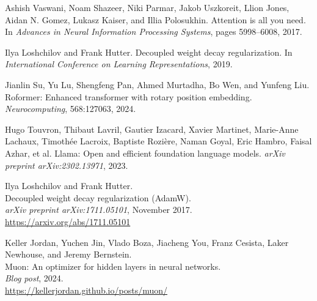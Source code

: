 \documentclass[11pt,a4paper]{article}
\begin{document}
\begin{thebibliography}{9}

Ashish Vaswani, Noam Shazeer, Niki Parmar, Jakob Uszkoreit, Llion Jones, Aidan N. Gomez, Lukasz Kaiser, and Illia Polosukhin.
\newblock Attention is all you need.
\newblock In \emph{Advances in Neural Information Processing Systems}, pages 5998--6008, 2017.

Ilya Loshchilov and Frank Hutter.
\newblock Decoupled weight decay regularization.
\newblock In \emph{International Conference on Learning Representations}, 2019.

Jianlin Su, Yu Lu, Shengfeng Pan, Ahmed Murtadha, Bo Wen, and Yunfeng Liu.
\newblock Roformer: Enhanced transformer with rotary position embedding.
\newblock \emph{Neurocomputing}, 568:127063, 2024.

Hugo Touvron, Thibaut Lavril, Gautier Izacard, Xavier Martinet, Marie-Anne Lachaux, Timothée Lacroix, Baptiste Rozière, Naman Goyal, Eric Hambro, Faisal Azhar, et al.
\newblock Llama: Open and efficient foundation language models.
\newblock \emph{arXiv preprint arXiv:2302.13971}, 2023.

Ilya Loshchilov and Frank Hutter.\\
\newblock Decoupled weight decay regularization (AdamW).\\
\newblock \emph{arXiv preprint arXiv:1711.05101}, November 2017.\\
\newblock \url{https://arxiv.org/abs/1711.05101}


Keller Jordan, Yuchen Jin, Vlado Boza, Jiacheng You, Franz Cesista, Laker Newhouse, and Jeremy Bernstein.\\
\newblock Muon: An optimizer for hidden layers in neural networks.\\
\newblock \emph{Blog post}, 2024.\\
\newblock \url{https://kellerjordan.github.io/posts/muon/}

\end{thebibliography}
\end{document}
